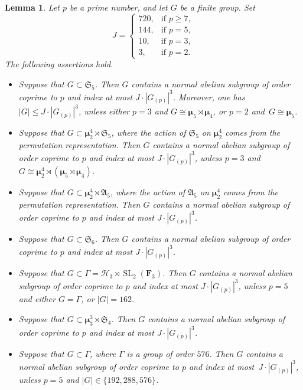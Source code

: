 \documentclass[10pt,a4paper]{amsart}
\newtheorem{lemma}{Lemma}
\newcommand{\HHH}{\mathscr{H}}
\DeclareMathOperator{\SL}{SL}
\def \ge {\geqslant}
\def \le {\leqslant}
\newcommand{\mumu}{\boldsymbol{\mu}}
\begin{document}
\begin{lemma}\label{lemma:auxiliary-subgroups}
Let $p$ be a prime number, and let $G$ be a finite group.
Set
\begin{equation}\label{eq:auxiliary-subgroups}
J=\begin{cases}
720, &\text{if\ } p\ge 7,\\
144, &\text{if\ } p=5,\\
10, &\text{if\ } p=3,\\
3, &\text{if\ } p=2.
\end{cases}
\end{equation}
The following assertions hold.
\begin{itemize}
\item[(i)] Suppose that $G\subset\mathfrak{S}_5$. Then $G$ contains a normal abelian subgroup
of order coprime to $p$ and index at most $J\cdot |G_{(p)}|^3$.
Moreover, one has~\mbox{$|G|\le J\cdot |G_{(p)}|^3$}, unless either $p=3$ and $G\cong\mumu_5\rtimes\mumu_4$, or $p=2$ and~\mbox{$G\cong\mumu_5$}.

\item[(ii)] Suppose that $G\subset \mumu_2^4\rtimes\mathfrak{S}_5$, where
the action of $\mathfrak{S}_5$ on $\mumu_2^4$ comes from the permutation representation.
Then $G$ contains a normal abelian subgroup
of order coprime to $p$ and index at most $J\cdot |G_{(p)}|^3$,
unless $p=3$ and~\mbox{$G\cong\mumu_2^4\rtimes (\mumu_5\rtimes\mumu_4)$}.

\item[(iii)] Suppose that $G\subset \mumu_2^4\rtimes\mathfrak{A}_5$, where
the action of $\mathfrak{A}_5$ on $\mumu_2^4$ comes from the permutation representation.
Then $G$ contains a normal abelian subgroup
of order coprime to $p$ and index at most $J\cdot |G_{(p)}|^3$.

\item[(iv)] Suppose that $G\subset\mathfrak{S}_6$.
Then $G$ contains a normal abelian subgroup
of order coprime to $p$ and index at most $J\cdot |G_{(p)}|^3$.

\item[(v)] Suppose that $G\subset\Gamma=\HHH_3\rtimes\SL_2(\mathbf{F}_3)$.
Then $G$ contains a normal abelian subgroup
of order coprime to $p$ and index at most $J\cdot |G_{(p)}|^3$,
unless $p=5$ and either $G=\Gamma$, or $|G|=162$.

\item[(vi)] Suppose that $G\subset\mumu_3^3\rtimes \mathfrak{S}_4$.
Then $G$ contains a normal abelian subgroup
of order coprime to $p$ and index at most $J\cdot |G_{(p)}|^3$.

\item[(vii)] Suppose that $G\subset\Gamma$, where $\Gamma$ is a group of order $576$.
Then $G$ contains a normal abelian subgroup
of order coprime to $p$ and index at most~\mbox{$J\cdot |G_{(p)}|^3$},
unless $p=5$ and $|G|\in\{192,288,576\}$.
\end{itemize}
\end{lemma}
\end{document}
